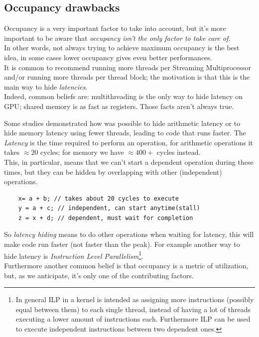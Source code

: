\subsection{Occupancy drawbacks}
Occupancy is a very important factor to take into account, but it's more important to be aware that \textit{occupancy isn't the only factor to take care of}.\\
In other words, not always trying to achieve maximum occupancy is the best idea, in some cases lower occupancy gives even better performances.\\
It is common to recommend running more threads per Streaming Multiprocessor and/or running more threads per thread block; the motivation is that this is the main way to hide \textit{latencies}.\\
Indeed, common beliefs are: multithreading is the only way to hide latency on GPU; shared memory is as fast as registers\cite{cudaguide}. Those facts aren't always true.

Some studies demonstrated how was possible to hide arithmetic latency or to hide memory latency using fewer threads, leading to code that runs faster.
The \textit{Latency} is the time required to perform an operation, for arithmetic operations it takes \(\approx20\) cycles; for memory we have \(\approx400+\) cycles instead.\\
This, in particular, means that  we can't start a dependent operation during these times, but they can be hidden by overlapping with other (independent) operations\cite{loweroccupancy}.

\begin{lstlisting}
	x= a + b; // takes about 20 cycles to execute
	y = a + c; // independent, can start anytime(stall)
	z = x + d; // dependent, must wait for completion
\end{lstlisting}
So \textit{latency hiding} means to do other operations when waiting for latency, this will make code run faster (not faster than the peak). For example another way to hide latency is \textit{Instruction Level Parallelism}\footnote{In general ILP in a kernel is intended as assigning more instructions (possibly equal between them) to each single thread, instead of having a lot of threads executing a lower amount of instructions each. Furthermore ILP can be used to execute independent instructions between two dependent ones\cite{perfoptimize}.}.\\
Furthermore another common belief is that occupancy is a metric of utilization, but, as we anticipate, it's only one of the contributing factors\cite{loweroccupancy}.

